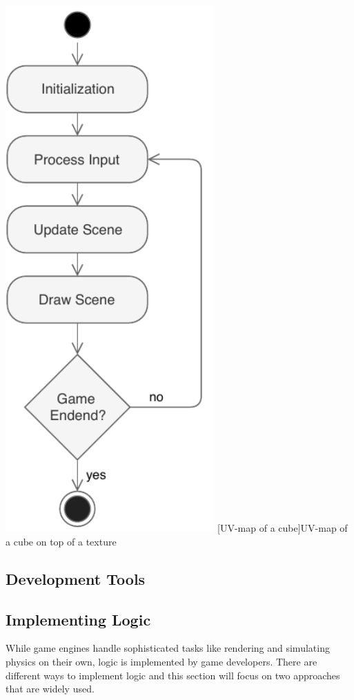\begin{center}
\noindent\includegraphics[width=8cm]{tex/img/ch03/GameLoop_03.pdf}
[UV-map of a cube]{UV-map of a cube on top of a texture}
\label{fig:game-loop}
\end{center}

\subsection{Development Tools}


\subsection{Implementing Logic}
While game engines handle sophisticated tasks like rendering and simulating physics on their own, logic is implemented by game developers. There are different ways to implement logic and this section will focus on two approaches that are widely used.

